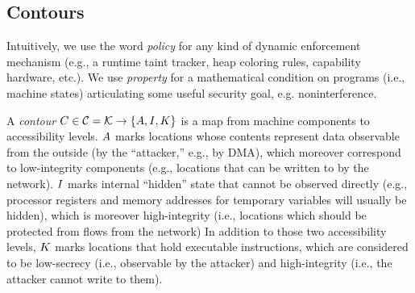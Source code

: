 \documentclass[conference]{IEEEtran}
\begin{document}
\cleardoublepage
{}

\subsection{Contours}

\iftext
Intuitively, we use the word {\em policy} for any kind of dynamic
enforcement mechanism (e.g., a runtime taint tracker, heap coloring rules,
capability hardware, etc.).
We use {\em property} for a mathematical
condition on programs (i.e., machine states) articulating some useful
security goal, e.g. noninterference.
\fi

A {\em contour} $C \in {\mathcal C} = {\mathcal K} \rightarrow \{A,
I, K\}$ is a map from machine components to accessibility levels.
$A$ marks locations whose contents represent data observable from the
outside (by the ``attacker,'' e.g., by DMA), which moreover correspond to
low-integrity components (e.g., locations that can be written to \iftext
{} \fi by the network). $I$ marks internal
``hidden'' state that cannot be observed directly (e.g., processor registers and
memory addresses for temporary variables will usually be hidden), which is
moreover high-integrity (i.e., locations which should be protected from flows
from the network)
%
%
In addition to those two accessibility levels, $K$ marks locations that
hold executable instructions, which are considered to be low-secrecy (i.e.,
observable by the attacker) and high-integrity (i.e., the attacker cannot write
to them).

\end{document}

